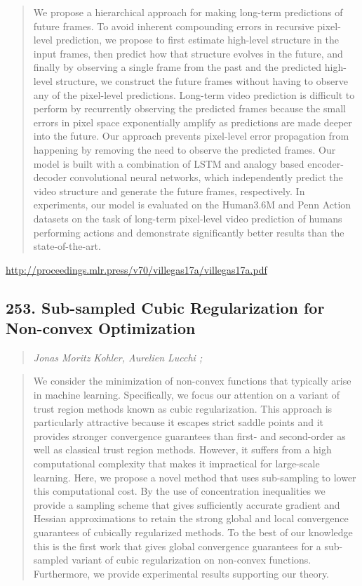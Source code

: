\documentclass{article}
\begin{document}
\begin{quote}
    We propose a hierarchical approach for making long-term predictions of future frames. To avoid inherent compounding errors in recursive pixel-level prediction, we propose to first estimate high-level structure in the input frames, then predict how that structure evolves in the future, and finally by observing a single frame from the past and the predicted high-level structure, we construct the future frames without having to observe any of the pixel-level predictions. Long-term video prediction is difficult to perform by recurrently observing the predicted frames because the small errors in pixel space exponentially amplify as predictions are made deeper into the future. Our approach prevents pixel-level error propagation from happening by removing the need to observe the predicted frames. Our model is built with a combination of LSTM and analogy based encoder-decoder convolutional neural networks, which independently predict the video structure and generate the future frames, respectively. In experiments, our model is evaluated on the Human3.6M and Penn Action datasets on the task of long-term pixel-level video prediction of humans performing actions and demonstrate significantly better results than the state-of-the-art.  \end{quote}

\href{http://proceedings.mlr.press/v70/villegas17a/villegas17a.pdf}{http://proceedings.mlr.press/v70/villegas17a/villegas17a.pdf}

\subsection{253. Sub-sampled Cubic Regularization for Non-convex Optimization}

\begin{quote}
\footnotesize{\textit{Jonas Moritz Kohler, Aurelien Lucchi ;}}
\end{quote}

\begin{quote}
    We consider the minimization of non-convex functions that typically arise in machine learning. Specifically, we focus our attention on a variant of trust region methods known as cubic regularization. This approach is particularly attractive because it escapes strict saddle points and it provides stronger convergence guarantees than first- and second-order as well as classical trust region methods. However, it suffers from a high computational complexity that makes it impractical for large-scale learning. Here, we propose a novel method that uses sub-sampling to lower this computational cost. By the use of concentration inequalities we provide a sampling scheme that gives sufficiently accurate gradient and Hessian approximations to retain the strong global and local convergence guarantees of cubically regularized methods. To the best of our knowledge this is the first work that gives global convergence guarantees for a sub-sampled variant of cubic regularization on non-convex functions. Furthermore, we provide experimental results supporting our theory.  \end{quote}
\end{document}
